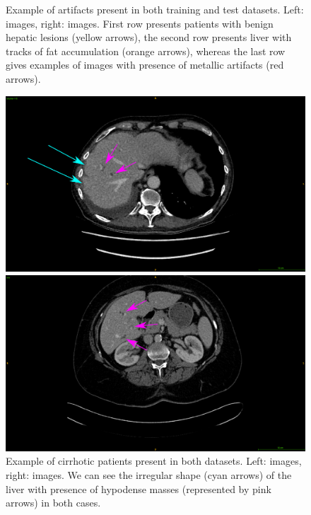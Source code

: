 \begin{figure}[!ht]
\begin{minipage}{0.45\linewidth}
	\end{minipage}
	\caption{Example of artifacts present in both training and test datasets. Left: \textbf{} images, right: \textbf{} images. First row presents patients with benign hepatic lesions (yellow arrows), the second row presents liver with tracks of fat accumulation (orange arrows), whereas the last row gives examples of images with presence of metallic artifacts (red arrows).}
	\label{fig:InterDb_artifacts}
\end{figure}
\begin{figure}[!ht]
	\centering
	\begin{minipage}{0.45\linewidth}
		\includegraphics[width=\linewidth]{../Contributions/images/ResizeLITS_cirrhoticPatientArrows}
	\end{minipage} \hspace{-0.1cm}
	\begin{minipage}{0.45\linewidth}
		\includegraphics[width=\linewidth]{../Contributions/images/ResizeTCIA_cirrhoticPatientArrows}
	\end{minipage}
	\caption{Example of cirrhotic patients present in both datasets.  Left: \textbf{} images, right: \textbf{} images. We can see the irregular shape (cyan arrows) of the liver with presence of hypodense masses (represented by pink arrows) in both cases.}
	\label{fig:InterDb_diseasedLivers}
\end{figure}

